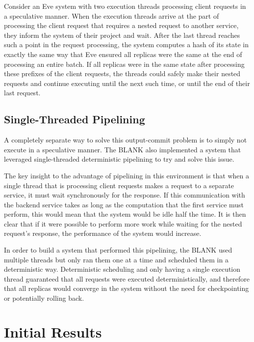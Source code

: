 \documentclass[11pt, oneside]{report}
\begin{document}

Consider an Eve system with two execution threads processing client requests in a speculative manner. When the execution threads arrive at the part of processing the client request that requires a nested request to another service, they inform the system of their project and wait. After the last thread reaches such a point in the request processing, the system computes a hash of its state in exactly the same way that Eve ensured all replicas were the same at the end of processing an entire batch. If all replicas were in the same state after processing these prefixes of the client requests, the threads could safely make their nested requests and continue executing until the next such time, or until the end of their last request.

\subsection{Single-Threaded Pipelining}

A completely separate way to solve this output-commit problem is to simply not execute in a speculative manner. The
BLANK %
also implemented a system that leveraged single-threaded deterministic pipelining to try and solve this issue.

The key insight to the advantage of pipelining in this environment is that when a single thread that is processing client requests makes a request to a separate service, it must wait synchronously for the response. If this communication with the backend service takes as long as the computation that the first service must perform, this would mean that the system would be idle half the time. It is then clear that if it were possible to perform more work while waiting for the nested request's response, the performance of the system would increase.

In order to build a system that performed this pipelining, the BLANK used multiple threads but only ran them one at a time and scheduled them in a deterministic way. Deterministic scheduling and only having a single execution thread guaranteed that all requests were executed deterministically, and therefore that all replicas would converge in the system without the need for checkpointing or potentially rolling back. 

\section{Initial Results}
\end{document}
